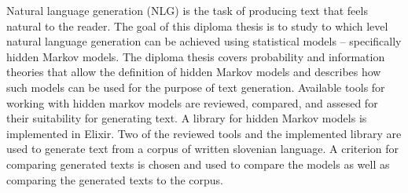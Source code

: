 Natural language generation (NLG) is the task of producing text that feels natural to the reader.
The goal of this diploma thesis is to study to which level natural language generation can be achieved using statistical models -- specifically hidden Markov models.
The diploma thesis covers probability and information theories that allow the definition of hidden Markov models and describes how such models can be used for the purpose of text generation.
Available tools for working with hidden markov models are reviewed, compared, and assesed for their suitability for generating text.
A library for hidden Markov models is implemented in Elixir.
Two of the reviewed tools and the implemented library are used to generate text from a corpus of written slovenian language.
A criterion for comparing generated texts is chosen and used to compare the models as well as comparing the generated texts to the corpus.
